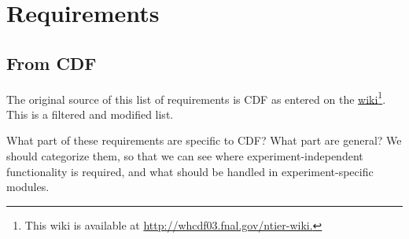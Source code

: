 \chapter{Requirements}

\section{From CDF}

The original source of this list of requirements is CDF as entered on
the \href{http://whcdf03.fnal.gov/ntier-wiki}{\frontier
wiki}\footnote{This wiki is available at
\url{http://whcdf03.fnal.gov/ntier-wiki.}}. This is a filtered and
modified list.

\begin{fixme}
What part of these requirements are specific to CDF? What part
are general? We should categorize them, so that we can see where
experiment-independent functionality is required, and what should be
handled in experiment-specific modules.
\end{fixme}

